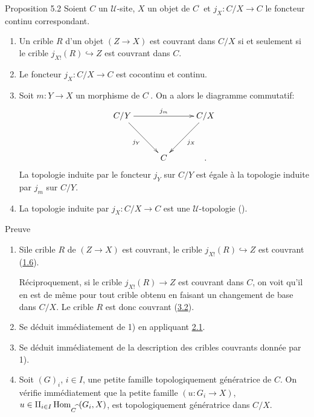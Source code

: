 \documentclass[10pt]{../fichiers-configuration-latex/smfart}
\begin{document}
\begin{enonce*}{Proposition 5.2}
Soient $C$ un $𝒰$-site, $X$ un objet de
$C^{\widehat{\phantom{,}}}$ et $j_X:C/X\rightarrow C$ le foncteur
continu correspondant.
\begin{enumerate}
\renewcommand{\labelenumi}{\theenumi)}
\item Un crible $R$ d'un objet $(Z\rightarrow X)$ est couvrant dans
$C/X$ si et seulement si le crible $j_{X!}(R)\hookrightarrow Z$ est
couvrant dans $C$.

\item Le foncteur $j_X:C/X\rightarrow C$ est cocontinu et continu.

\item Soit $m:Y\rightarrow X$ un morphisme de
$C^{\widehat{\phantom{,}}}$. On a alors le diagramme commutatif:
\[
\xymatrix@C=1cm@R=1.25cm{
C/Y \ar[rr]^{j_m} \ar[rd]_{j_Y}&       &C/X \ar[ld]^{j_X}\\
    &  C    &.
}
\]
La topologie induite par le foncteur $j_Y$ sur $C/Y$ est égale
à la topologie induite par $j_m$ sur $C/Y$.

\item La topologie induite par $j_X:C/X\rightarrow C$ est une
$𝒰$-topologie ().
\end{enumerate}
\end{enonce*}

\begin{enonce*}[remark]{Preuve}
\begin{enumerate}
\renewcommand{\labelenumi}{\theenumi)}
\item Si\pageoriginale le crible $R$ de $(Z\rightarrow X)$ est
couvrant, le crible $j_{X!}(R)\hookrightarrow Z$ est couvrant
(\hyperref[III.prop1.6]{1.6}).

Réciproquement, si le crible $j_{X!}(R)\rightarrow Z$ est
couvrant dans $C$, on voit qu'il en est de même pour tout crible
obtenu en faisant un changement de base dans $C/X$. Le crible $R$
est donc couvrant (\hyperref[III.prop3.2]{3.2}).

\item Se déduit immédiatement de 1) en appliquant \hyperref[III.def2.1]{2.1}.

\item Se déduit immédiatement de la description des cribles
couvrants donnée par 1).

\item Soit $(G)_i$, $i\in I$, une petite famille topologiquement
génératrice de $C$. On vérifie immédiatement que la
petite famille $(u:G_i\rightarrow X)$, $u\in \amalg_{i\in
I}\operatorname{Hom}_{C^{\widehat{\phantom{,}}}}(G_i, X)$, est topologiquement
génératrice dans $C/X$.
\end{enumerate}
\end{enonce*}
\end{document}

